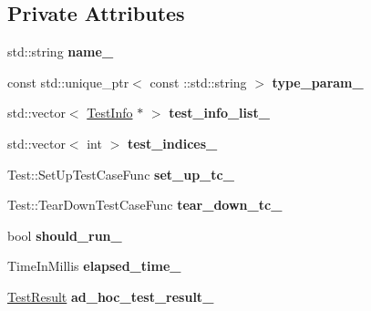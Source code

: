 \subsection*{Private Attributes}
\begin{DoxyCompactItemize}
\item 
\mbox{\label{classtesting_1_1_test_case_a6c16e28e7555dc6a158415b3bfc4f833}} 
std\+::string {\bfseries name\+\_\+}
\item 
\mbox{\label{classtesting_1_1_test_case_a94cab74f74259131db883b7f460a5247}} 
const std\+::unique\+\_\+ptr$<$ const \+::std\+::string $>$ {\bfseries type\+\_\+param\+\_\+}
\item 
\mbox{\label{classtesting_1_1_test_case_adce272a48399dd67a7bdd14fa7e99b80}} 
std\+::vector$<$ \mbox{\hyperlink{classtesting_1_1_test_info}{Test\+Info}} $\ast$ $>$ {\bfseries test\+\_\+info\+\_\+list\+\_\+}
\item 
\mbox{\label{classtesting_1_1_test_case_a6bb04b98c46a3eecf7a4e6f62593a827}} 
std\+::vector$<$ int $>$ {\bfseries test\+\_\+indices\+\_\+}
\item 
\mbox{\label{classtesting_1_1_test_case_a272e1bcea07b9654ffc5470e64579d35}} 
Test\+::\+Set\+Up\+Test\+Case\+Func {\bfseries set\+\_\+up\+\_\+tc\+\_\+}
\item 
\mbox{\label{classtesting_1_1_test_case_a0ceb56d10b167cfc51a286a7b9b2fbbc}} 
Test\+::\+Tear\+Down\+Test\+Case\+Func {\bfseries tear\+\_\+down\+\_\+tc\+\_\+}
\item 
\mbox{\label{classtesting_1_1_test_case_a2f98fefe1f624c879e0320882c561d85}} 
bool {\bfseries should\+\_\+run\+\_\+}
\item 
\mbox{\label{classtesting_1_1_test_case_a0379c376d8832e6fd1d5d9c7c3c32759}} 
Time\+In\+Millis {\bfseries elapsed\+\_\+time\+\_\+}
\item 
\mbox{\label{classtesting_1_1_test_case_a4aec85d3398a4a0161f1cde69c07aadc}} 
\mbox{\hyperlink{classtesting_1_1_test_result}{Test\+Result}} {\bfseries ad\+\_\+hoc\+\_\+test\+\_\+result\+\_\+}
\end{DoxyCompactItemize}
